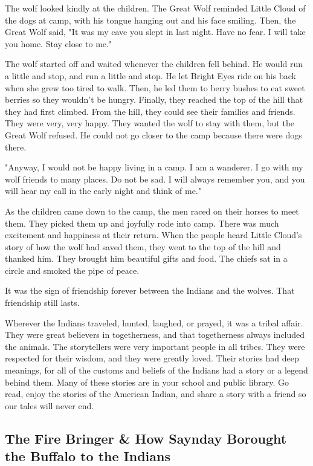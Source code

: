 The wolf looked kindly at the children. The Great Wolf reminded Little Cloud of the dogs at camp, with his tongue hanging out and his face smiling. Then, the Great Wolf said, "It was my cave you slept in last night. Have no fear. I will take you home. Stay close to me."

The wolf started off and waited whenever the children fell behind. He would run a little and stop, and run a little and stop. He let Bright Eyes ride on his back when she grew too tired to walk. Then, he led them to berry bushes to eat sweet berries so they wouldn't be hungry. Finally, they reached the top of the hill that they had first climbed. From the hill, they could see their families and friends. They were very, very happy. They wanted the wolf to stay with them, but the Great Wolf refused. He could not go closer to the camp because there were dogs there.

"Anyway, I would not be happy living in a camp. I am a wanderer. I go with my wolf friends to many places. Do not be sad. I will always remember you, and you will hear my call in the early night and think of me."

As the children came down to the camp, the men raced on their horses to meet them. They picked them up and joyfully rode into camp. There was much excitement and happiness at their return. When the people heard Little Cloud's story of how the wolf had saved them, they went to the top of the hill and thanked him. They brought him beautiful gifts and food. The chiefs sat in a circle and smoked the pipe of peace.

It was the sign of friendship forever between the Indians and the wolves. That friendship still lasts.

Wherever the Indians traveled, hunted, laughed, or prayed, it was a tribal affair. They were great believers in togetherness, and that togetherness always included the animals. The storytellers were very important people in all tribes. They were respected for their wisdom, and they were greatly loved. Their stories had deep meanings, for all of the customs and beliefs of the Indians had a story or a legend behind them. Many of these stories are in your school and public library. Go read, enjoy the stories of the American Indian, and share a story with a friend so our tales will never end.

\subsection{The Fire Bringer \& How Saynday Borought the Buffalo to the Indians}

